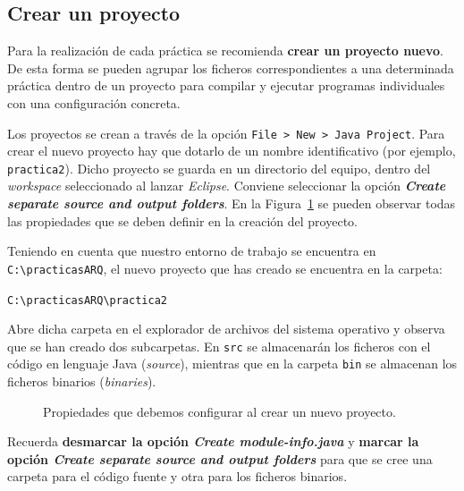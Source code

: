 \documentclass[
  spanish,
  11pt,
  a4paper,
  DIV=11,
  numbers=noendperiod]{scrartcl}
\begin{document}
\subsection{Crear un proyecto}\label{crear-un-proyecto}

Para la realización de cada práctica se recomienda \textbf{crear un proyecto nuevo}. De esta forma se pueden agrupar los ficheros correspondientes a una determinada práctica dentro de un proyecto para compilar y ejecutar programas individuales con una configuración concreta.

Los proyectos se crean a través de la opción \texttt{File\ \textgreater{}\ New\ \textgreater{}\ Java\ Project}. Para crear el nuevo proyecto hay que dotarlo de un nombre identificativo (por ejemplo, \texttt{practica2}). Dicho proyecto se guarda en un directorio del equipo, dentro del \emph{workspace} seleccionado al lanzar \emph{Eclipse}. Conviene seleccionar la opción \textbf{\emph{Create separate source and output folders}}. En la Figura~\ref{fig-new_project} se pueden observar todas las propiedades que se deben definir en la creación del proyecto.

Teniendo en cuenta que nuestro entorno de trabajo se encuentra en \texttt{C:\textbackslash{}practicasARQ}, el nuevo proyecto que has creado se encuentra en la carpeta:

\texttt{C:\textbackslash{}practicasARQ\textbackslash{}practica2}

Abre dicha carpeta en el explorador de archivos del sistema operativo y observa que se han creado dos subcarpetas. En \texttt{src} se almacenarán los ficheros con el código en lenguaje Java (\emph{source}), mientras que en la carpeta \texttt{bin} se almacenan los ficheros binarios (\emph{binaries}).

\begin{figure}
\caption{Propiedades que debemos configurar al crear un nuevo proyecto.}\label{fig-new_project}
\end{figure}

\begin{tcolorbox}[enhanced jigsaw, toprule=.15mm, coltitle=black, titlerule=0mm, opacitybacktitle=0.6, breakable, colback=white, colframe=quarto-callout-warning-color-frame, colbacktitle=quarto-callout-warning-color!10!white, opacityback=0, title={Configuración del proyecto}, bottomtitle=1mm, rightrule=.15mm, toptitle=1mm, left=2mm, bottomrule=.15mm, leftrule=.75mm, arc=.35mm]

Recuerda \textbf{desmarcar la opción \emph{Create module-info.java}} y \textbf{marcar la opción \emph{Create separate source and output folders}} para que se cree una carpeta para el código fuente y otra para los ficheros binarios.

\end{tcolorbox}
\end{document}
